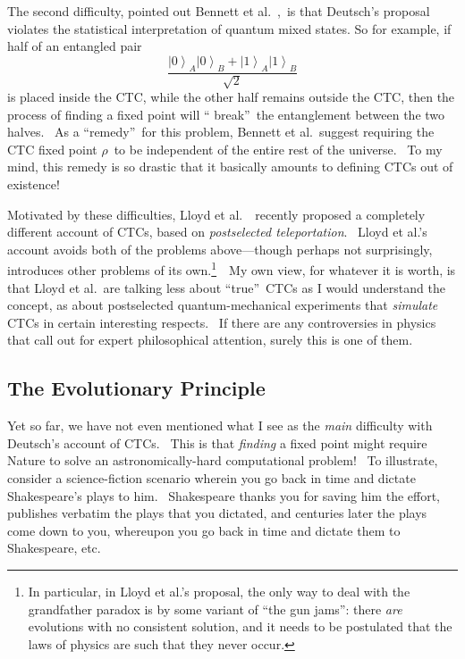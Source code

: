 \documentclass[11pt,onecolumn]{article}%
\begin{document}
The second difficulty, pointed out Bennett et al.\ \cite{blss},\ is that
Deutsch's proposal violates the statistical interpretation of quantum mixed
states. So for example, if half of an entangled pair%
\[
\frac{\left\vert 0\right\rangle _{A}\left\vert 0\right\rangle _{B}+\left\vert
1\right\rangle _{A}\left\vert 1\right\rangle _{B}}{\sqrt{2}}%
\]
is placed inside the CTC, while the other half remains outside the CTC, then
the process of finding a fixed point will \textquotedblleft
break\textquotedblright\ the entanglement between the two halves. \ As a
\textquotedblleft remedy\textquotedblright\ for this problem, Bennett et
al.\ suggest requiring the CTC fixed point $\rho$\ to be independent of the
entire rest of the universe. \ To my mind, this remedy is so drastic that it
basically amounts to defining CTCs out of existence!

Motivated by these difficulties, Lloyd et al.\ \cite{lmggs}\ recently proposed
a completely different account of CTCs, based on \textit{postselected
teleportation}. \ Lloyd et al.'s account avoids both of the problems
above---though perhaps not surprisingly, introduces other problems of its
own.\footnote{In particular, in Lloyd et al.'s proposal, the only way to deal
with the grandfather paradox is by some variant of \textquotedblleft the gun
jams\textquotedblright: there \textit{are} evolutions with no consistent
solution, and it needs to be postulated that the laws of physics are such that
they never occur.}\ \ My own view, for whatever it is worth, is that Lloyd et
al.\ are talking less about \textquotedblleft true\textquotedblright\ CTCs as
I would understand the concept, as about postselected quantum-mechanical
experiments that \textit{simulate} CTCs in certain interesting respects. \ If
there are any controversies in physics that call out for expert philosophical
attention, surely this is one of them.

\subsection{The Evolutionary Principle\label{EP}}

Yet so far, we have not even mentioned what I see as the \textit{main}
difficulty with Deutsch's account of CTCs. \ This is that \textit{finding} a
fixed point might require Nature to solve an astronomically-hard computational
problem! \ To illustrate, consider a science-fiction scenario wherein you go
back in time and dictate Shakespeare's plays to him. \ Shakespeare thanks you
for saving him the effort, publishes verbatim the plays that you dictated, and
centuries later the plays come down to you, whereupon you go back in time and
dictate them to Shakespeare, etc.
\end{document}
